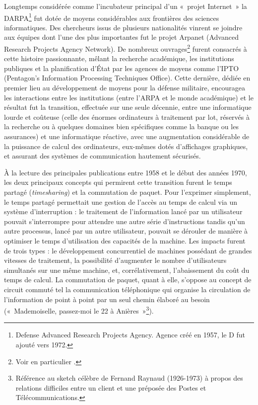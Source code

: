 \documentclass{FramateX}
\begin{document}
\begin{refsection}
Longtemps considérée comme l'incubateur principal
d'un «~projet Internet~» la DARPA\footnote{Defense
Advanced Research Projects Agency. Agence créé en 1957, le D fut ajouté vers 1972.} 
fut dotée de moyens considérables aux frontières des sciences
informatiques. Des chercheurs issus de plusieurs nationalités vinrent
se joindre aux équipes dont l'une des plus importantes
fut le projet Arpanet (Advanced Research Projects Agency Network). De
nombreux ouvrages\footnote{Voir en particulier \cite{norbergtransforming2000}.}
furent consacrés à cette histoire passionnante, mêlant la recherche
académique, les institutions publiques et la planification
d'État par les agences de moyens comme
l'IPTO (Pentagon's Information
Processing Techniques Office). Cette dernière, dédiée en premier lieu
au développement de moyens pour la défense militaire, encouragea les
interactions entre les institutions (entre l'ARPA et
le monde académique) et le résultat fut la transition, effectuée sur
une seule décennie, entre une informatique lourde et coûteuse (celle
des énormes ordinateurs à traitement par lot, réservés à la recherche
ou à quelques domaines bien spécifiques comme la banque ou les
assurances) et une informatique réactive, avec une augmentation
considérable de la puissance de calcul des ordinateurs, eux-mêmes dotés
d'affichages graphiques, et assurant des systèmes de
communication hautement sécurisés.

À la lecture des principales publications entre 1958 et le début des
années 1970, les deux principaux concepts qui permirent cette
transition furent le temps partagé (\textit{timesharing}) et la
commutation de paquet. Pour l'exprimer simplement, le temps partagé
permettait une gestion de l'accès au temps de calcul
via un système d'interruption : le traitement de
l'information lancé par un utilisateur pouvait
s'interrompre pour attendre une autre série
d'instructions tandis qu'un autre
processus, lancé par un autre utilisateur, pouvait se dérouler de
manière à optimiser le temps d'utilisation des
capacités de la machine. Les impacts furent de trois types : le
développement concurrentiel de machines possédant de grandes vitesses
de traitement, la possibilité d'augmenter le nombre
d'utilisateurs simultanés sur une même machine, et,
corrélativement, l'abaissement du coût du temps de
calcul. La commutation de paquet, quant à elle,
s'oppose au concept de circuit commuté tel la
communication téléphonique qui organise la circulation de
l'information de point à point par un seul chemin
élaboré au besoin («~Mademoiselle, passez-moi le 22 à
Anières~»\footnote{Référence au sketch célèbre de Fernand Raynaud
(1926-1973) à propos des relations difficiles entre un client et une
préposée des Postes et Télécommunications.}). 


\end{refsection}
\end{document}
